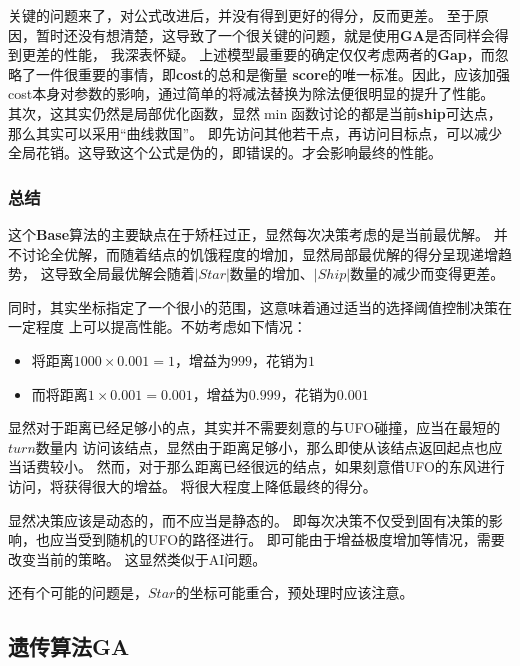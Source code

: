 \documentclass[hyperref,UTF8]{ctexart}
\theoremstyle{definition}
\theoremstyle{remark}
\numberwithin{equation}{subsection}
\newcommand{\Emph}{\textbf}
\begin{document}
	关键的问题来了，对公式改进后，并没有得到更好的得分，反而更差。
	至于原因，暂时还没有想清楚，这导致了一个很关键的问题，就是使用\Emph{GA}是否同样会得到更差的性能，
	我深表怀疑。
	上述模型最重要的确定仅仅考虑两者的\Emph{Gap}，而忽略了一件很重要的事情，即\Emph{cost}的总和是衡量
	\Emph{score}的唯一标准。因此，应该加强cost本身对参数的影响，通过简单的将减法替换为除法便很明显的提升了性能。
	其次，这其实仍然是局部优化函数，显然$\min$函数讨论的都是当前\Emph{ship}可达点，那么其实可以采用“曲线救国”。
	即先访问其他若干点，再访问目标点，可以减少全局花销。这导致这个公式是伪的，即错误的。才会影响最终的性能。
	
\subsubsection{总结}

	这个\Emph{Base}算法的主要缺点在于矫枉过正，显然每次决策考虑的是当前最优解。
	并不讨论全优解，而随着结点的饥饿程度的增加，显然局部最优解的得分呈现递增趋势，
	这导致全局最优解会随着$|Star|$数量的增加、$|Ship|$数量的减少而变得更差。
	
	同时，其实坐标指定了一个很小的范围，这意味着通过适当的选择阈值控制决策在一定程度
	上可以提高性能。不妨考虑如下情况：
	\begin{itemize}
	
		\item 将距离$1000 \times 0.001 = 1$，增益为$999$，花销为$1$
		
		\item 而将距离$1 \times 0.001 = 0.001$，增益为$0.999$，花销为$0.001$
		
	\end{itemize}
	
	显然对于距离已经足够小的点，其实并不需要刻意的与UFO碰撞，应当在最短的$turn$数量内
	访问该结点，显然由于距离足够小，那么即使从该结点返回起点也应当话费较小。
	然而，对于那么距离已经很远的结点，如果刻意借UFO的东风进行访问，将获得很大的增益。
	将很大程度上降低最终的得分。
	
	显然决策应该是动态的，而不应当是静态的。
	即每次决策不仅受到固有决策的影响，也应当受到随机的UFO的路径进行。
	即可能由于增益极度增加等情况，需要改变当前的策略。
	这显然类似于AI问题。
	
	还有个可能的问题是，$Star$的坐标可能重合，预处理时应该注意。
	
\subsection{遗传算法GA}
\label{sec:GA}
\end{document}
